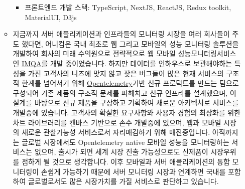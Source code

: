 \begin{itemize}[label=]
\begin{itemize}[label=]
\begin{itemize}[label=]
			            \item 프론트엔드 개발 스택: TypeScript, NextJS, ReactJS, Redux toolkit, MaterialUI, D3js
		            \end{itemize}
	\item[\emoji{high-voltage}]
		\colorbox{GrayBackground}{
			\begin{minipage}{1.65\textwidth}
				지금까지 서버 애플리케이션과 인프라들의 모니터링 시장을 여러 회사들이 주도 했다면, 어니컴은 국내 최초로 웹 그리고 모바일의 성능 모니터링 솔루션을 개발하여 회사의 미래 수익원으로 전략적으로 웹 모바일 성능모니터링서비스인 \href{https://imqa.io}{IMQA}를 개발 중이었습니다. 하지만 데이터를 인하우스로 보관해야하는 특성을 가진 고객사의 니즈에 맞지 않고 잦은 버그들이 많은 현재 서비스의 구조적 한계를 넘어서기 위해 \href{https://opentelemetry.io/}{Opentelemetry}기반 신규 프로덕트를 만드는 팀으로 구성되어 기존 제품의 구조적 문제를 파헤치고 신규 인프라를 설계했으며, 이 설계를 바탕으로 신규 제품을 구상하고 기획하여 새로운 아키텍쳐로 서비스를 개발중에 있습니다. 고객사의 확실한 요구사항와 사용자 경험의 최상화를 위한 차트 라이브러리를 캔바스 기반으로 손수 개발중에 있으며, 웹과 모바일 시장의 새로운 관찰가능성 서비스로서 자리매김하기 위해 매진중입니다. 아직까지는 글로벌 시장에서도 Opentelemetry native 모바일 성능을 모니터링하는 서비스는 없으며, 출시가 되면 세계 시장 진출 가능성으로도 신제품이 시장우위를 점하게 될 것으로 생각합니다. 이후 모바일과 서버 애플리케이션의 통합 모니터링이 손쉽게 가능하기 때문에 서버 모니터링 시장과 연계하면 국내를 포함하여 글로벌로서도 많은 시장가치를 가질 서비스로 판단하고 있습니다.
			\end{minipage}
		}
\end{itemize}

\divider



\end{itemize}
